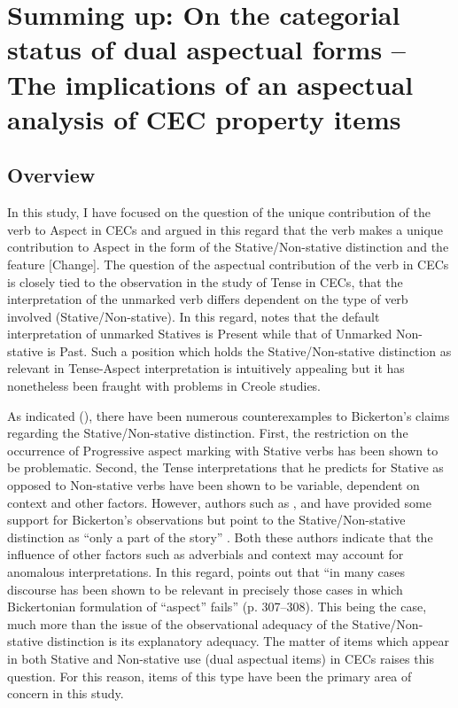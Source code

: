 \chapter[Summing up: On the categorial status of dual aspectual forms]{Summing up: On the categorial status of dual aspectual forms -- The implications of an aspectual analysis of CEC property items}
\label{sec:6}\label{ch:6}

\section{Overview}\label{sec:6.0}
In this study, I have focused on the question of the unique contribution of the verb to Aspect in CECs and argued in this regard that the verb makes a unique contribution to Aspect in the form of the Stative\slash Non-stative distinction and the feature [Change]. The question of the aspectual contribution of the verb in CECs is closely tied to the observation in the study of Tense in CECs, that the interpretation of the unmarked verb differs dependent on the type of verb involved (Stative\slash Non-stative). In this regard, \citet{Bickerton1975} notes that the default interpretation of unmarked Statives is Present while that of Unmarked Non-stative is Past. Such a position which holds the Stative\slash Non-stative distinction as relevant in Tense-Aspect interpretation is intuitively appealing but it has nonetheless been fraught with problems in Creole studies. 

As indicated (), there have been numerous counterexamples to Bickerton’s claims regarding the Stative\slash Non-stative distinction. First, the restriction on the occurrence of Progressive aspect marking with Stative verbs has been shown to be problematic. Second, the Tense interpretations that he predicts for Stative as opposed to Non-stative verbs have been shown to be variable, dependent on context and other factors. However, authors such as \citet{Winford1993}, and \citet{Gooden2008} have provided some support for Bickerton’s observations but point to the Stative\slash Non-stative distinction as “only a part of the story” \citep[307]{Gooden2008}. Both these authors indicate that the influence of other factors such as adverbials and context may account for anomalous interpretations. In this regard, \citet{Gooden2008} points out that “in many cases discourse has been shown to be relevant in precisely those cases in which Bickertonian formulation of “aspect” fails” (p. 307--308). This being the case, much more than the issue of the observational adequacy of the Stative\slash Non-stative distinction is its explanatory adequacy. The matter of items which appear in both Stative and Non-stative use (dual aspectual items) in CECs raises this question. For this reason, items of this type have been the primary area of concern in this study. 

